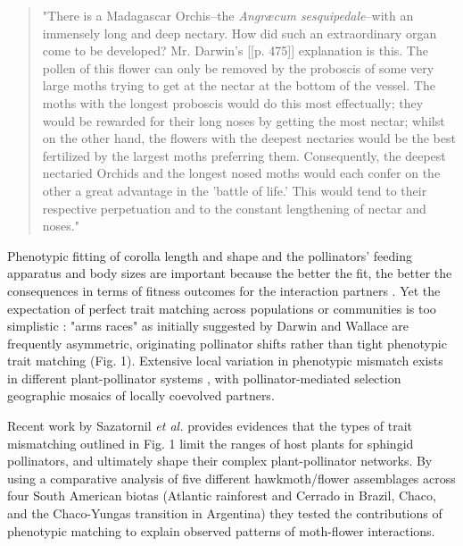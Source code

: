 \documentclass[a4paper,12pt]{article}
\begin{document}
\begin{spacing}{1.0}
	\begin{quotation}
	 "There is a Madagascar Orchis--the \textit{Angræcum sesquipedale}--with an immensely long and deep nectary. How did such an extraordinary organ come to be developed? Mr. Darwin's [[p. 475]] explanation is this. The pollen of this flower can only be removed by the proboscis of some very large moths trying to get at the nectar at the bottom of the vessel. The moths with the longest proboscis would do this most effectually; they would be rewarded for their long noses by getting the most nectar; whilst on the other hand, the flowers with the deepest nectaries would be the best fertilized by the largest moths preferring them. Consequently, the deepest nectaried Orchids and the longest nosed moths would each confer on the other a great advantage in the 'battle of life.' This would tend to their respective perpetuation and to the constant lengthening of nectar and noses."
	 \end{quotation}
 \end{spacing}
 
 Phenotypic fitting of corolla length and shape and the pollinators' feeding apparatus and body sizes are important because the better the fit, the better the consequences in terms of fitness outcomes for the interaction partners \citep{Nilsson:1988}. Yet the expectation of perfect trait matching across populations or communities is too simplistic \citep{Anderson:2010}: "arms races" as initially suggested by Darwin and Wallace are frequently asymmetric, originating pollinator shifts rather than tight phenotypic trait matching (Fig. 1). Extensive local variation in phenotypic mismatch exists in different plant-pollinator systems \citep[e.g., ][]{Cocucci:2009,Anderson:2010,More:2012}, with pollinator-mediated selection geographic mosaics of locally coevolved partners.

 
Recent work by Sazatornil \textit{et al.} \citep{Sazatornil:2016} provides evidences that the types of trait mismatching outlined in Fig. 1 limit the ranges of host plants for sphingid pollinators, and ultimately shape their complex plant-pollinator networks. By using a comparative analysis of five different hawkmoth/flower assemblages across four South American biotas (Atlantic rainforest and Cerrado in Brazil, Chaco, and the Chaco-Yungas transition in Argentina) they tested the contributions of phenotypic matching to explain observed patterns of moth-flower interactions. 
\end{document}
